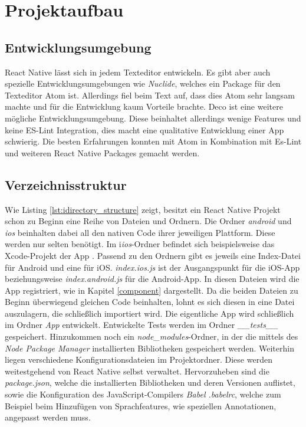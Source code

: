 \section{Projektaufbau}

\subsection{Entwicklungsumgebung}
React Native lässt sich in jedem Texteditor entwickeln. Es gibt aber auch spezielle Entwicklungsumgebungen wie \textit{Nuclide}, welches ein Package für den Texteditor Atom ist. Allerdings fiel beim Text auf, dass dies Atom sehr langsam machte und für die Entwicklung kaum Vorteile brachte. Deco ist eine weitere mögliche Entwicklungsumgebung. Diese beinhaltet allerdings wenige Features und keine ES-Lint Integration, dies macht eine qualitative Entwicklung einer App schwierig. Die besten Erfahrungen konnten mit Atom in Kombination mit Es-Lint und weiteren React Native Packages gemacht werden. 

\subsection{Verzeichnisstruktur}
Wie Listing \ref{lst:idirectory_structure} zeigt, besitzt ein React Native Projekt schon zu Beginn eine Reihe von Dateien und Ordnern.
Die Ordner \textit{android} und \textit{ios} beinhalten dabei all den nativen Code ihrer jeweiligen Plattform. Diese werden nur selten benötigt. Im i\textit{ios}-Ordner befindet sich beispielsweise das Xcode-Projekt der App \cite{carli_project_2016}. Passend zu den Ordnern gibt es jeweils eine Index-Datei für Android und eine für iOS. \textit{index.ios.js} ist der Ausgangspunkt für die iOS-App beziehungsweise \textit{index.android.js} für die Android-App. In diesen Dateien wird die App registriert, wie in Kapitel \ref{component} dargestellt. Da die beiden Dateien zu Beginn überwiegend gleichen Code beinhalten, lohnt es sich diesen in eine Datei auszulagern, die schließlich importiert wird. Die eigentliche App wird schließlich im Ordner \textit{App} entwickelt. Entwickelte Tests werden im Ordner \textit{\_\_tests\_\_} gespeichert. Hinzukommen noch ein \textit{node\_modules}-Ordner, in der die mittels des \textit{Node Package Manager} installierten Bibliotheken gespeichert werden. Weiterhin liegen verschiedene Konfigurationsdateien im Projektordner. Diese werden weitestgehend von React Native selbst verwaltet. Hervorzuheben sind die \textit{package.json}, welche die installierten Bibliotheken und deren Versionen auflistet, sowie die Konfiguration des JavaScript-Compilers \textit{Babel .babelrc}, welche zum Beispiel beim Hinzufügen von Sprachfeatures, wie speziellen Annotationen, angepasst werden muss. 

